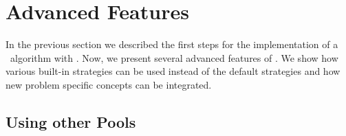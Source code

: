 
\section{Advanced Features}
\label{section:UsingAbacusAdvanced}

In the previous section we described the first steps for the implementation
of a \lpbab\ algorithm with \ABACUS. 
Now, we present several advanced features of \ABACUS. We show how
various built-in strategies can be used instead of the default
strategies and how new problem specific concepts can be integrated.

\subsection{Using other Pools}
\label{section:otherPools}

